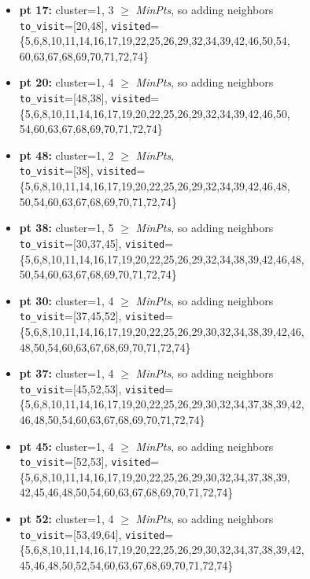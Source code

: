 \documentclass[11pt]{article}
\begin{document}
\begin{itemize}[label=$\star$]
\begin{itemize}[label=$\cdot$]
				\item \textbf{pt 17:} cluster=1, 3 $\ge$ \textit{MinPts}, so adding neighbors \\ \texttt{to\_visit}=[20,48], \texttt{visited}=\{5,6,8,10,11,14,16,17,19,22,25,26,29,32,34,39,42,46,50,54,\\60,63,67,68,69,70,71,72,74\}
				\item \textbf{pt 20:} cluster=1, 4 $\ge$ \textit{MinPts}, so adding neighbors \\ \texttt{to\_visit}=[48,38], \texttt{visited}=\{5,6,8,10,11,14,16,17,19,20,22,25,26,29,32,34,39,42,46,50,\\54,60,63,67,68,69,70,71,72,74\}
				\item \textbf{pt 48:} cluster=1, 2 $\ge$ \textit{MinPts}, \\ \texttt{to\_visit}=[38], \texttt{visited}=\{5,6,8,10,11,14,16,17,19,20,22,25,26,29,32,34,39,42,46,48,\\50,54,60,63,67,68,69,70,71,72,74\}
				\item \textbf{pt 38:} cluster=1, 5 $\ge$ \textit{MinPts}, so adding neighbors \\ \texttt{to\_visit}=[30,37,45], \texttt{visited}=\{5,6,8,10,11,14,16,17,19,20,22,25,26,29,32,34,38,39,42,46,48,\\50,54,60,63,67,68,69,70,71,72,74\}
				\item \textbf{pt 30:} cluster=1, 4 $\ge$ \textit{MinPts}, so adding neighbors \\ \texttt{to\_visit}=[37,45,52], \texttt{visited}=\{5,6,8,10,11,14,16,17,19,20,22,25,26,29,30,32,34,38,39,42,46,\\48,50,54,60,63,67,68,69,70,71,72,74\}
				\item \textbf{pt 37:} cluster=1, 4 $\ge$ \textit{MinPts}, so adding neighbors \\ \texttt{to\_visit}=[45,52,53], \texttt{visited}=\{5,6,8,10,11,14,16,17,19,20,22,25,26,29,30,32,34,37,38,39,42,\\46,48,50,54,60,63,67,68,69,70,71,72,74\}
				\item \textbf{pt 45:} cluster=1, 4 $\ge$ \textit{MinPts}, so adding neighbors \\ \texttt{to\_visit}=[52,53], \texttt{visited}=\{5,6,8,10,11,14,16,17,19,20,22,25,26,29,30,32,34,37,38,39,\\42,45,46,48,50,54,60,63,67,68,69,70,71,72,74\}
				\item \textbf{pt 52:} cluster=1, 4 $\ge$ \textit{MinPts}, so adding neighbors \\ \texttt{to\_visit}=[53,49,64], \texttt{visited}=\{5,6,8,10,11,14,16,17,19,20,22,25,26,29,30,32,34,37,38,39,42,\\45,46,48,50,52,54,60,63,67,68,69,70,71,72,74\}

\end{itemize}
\end{itemize}
\end{document}

